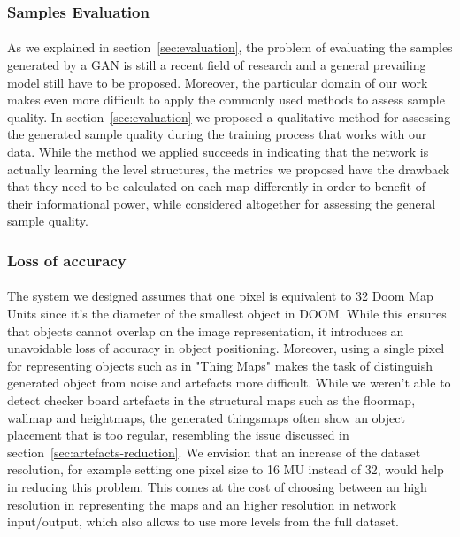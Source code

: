 \subsubsection{Samples Evaluation}
\paragraph{} As we explained in section~\ref{sec:evaluation}, the problem of evaluating the samples generated by a GAN is still a recent field of research and a general prevailing model still have to be proposed. Moreover, the particular domain of our work makes even more difficult to apply the commonly used methods to assess sample quality. In section~\ref{sec:evaluation} we proposed a qualitative method for assessing the generated sample quality during the training process that works with our data. While the method we applied succeeds in indicating that the network is actually learning the level structures, the metrics we proposed have the drawback that they need to be calculated on each map differently in order to benefit of their informational power, while considered altogether for assessing the general sample quality. 

\subsubsection{Loss of accuracy}
\paragraph{} The system we designed assumes that one pixel is equivalent to 32 Doom Map Units since it's the diameter of the smallest object in DOOM. While this ensures that objects cannot overlap on the image representation, it introduces an unavoidable loss of accuracy in object positioning. Moreover, using a single pixel for representing objects such as in "Thing Maps" makes the task of distinguish generated object from noise and artefacts more difficult. While we weren't able to detect checker board artefacts in the structural maps such as the floormap, wallmap and heightmaps, the generated \glspl{thingsmap} often show an object placement that is too regular, resembling the issue discussed in section~\ref{sec:artefacts-reduction}. We envision that an increase of the dataset resolution, for example setting one pixel size to 16 MU instead of 32, would help in reducing this problem. This comes at the cost of choosing between an high resolution in representing the maps and an higher resolution in network input/output, which also allows to use more levels from the full dataset.

